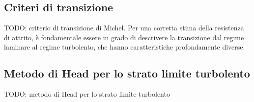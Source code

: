 \subsection{Criteri di transizione}
{\color{red} TODO: criterio di transizione di Michel.}
Per una corretta stima della resistenza di attrito, è fondamentale essere in grado di descrivere la transizione dal regime laminare al regime turbolento, che hanno caratteristiche profondamente diverse.

\subsection{Metodo di Head per lo strato limite turbolento}
{\color{red} TODO: metodo di Head per lo strato limite turbolento}


% 

